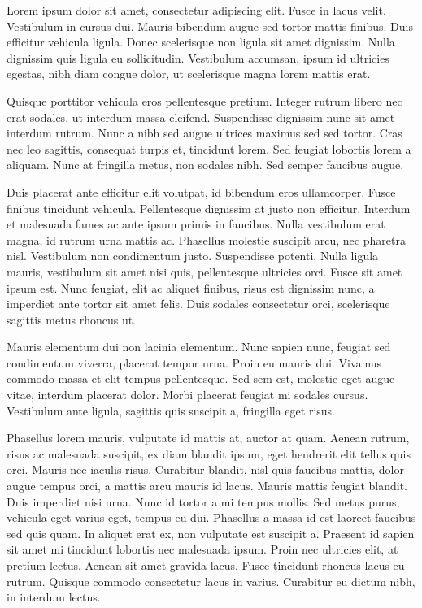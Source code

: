 Lorem ipsum dolor sit amet, consectetur adipiscing elit. Fusce in lacus velit.
Vestibulum in cursus dui. Mauris bibendum augue sed tortor mattis finibus. Duis
efficitur vehicula ligula. Donec scelerisque non ligula sit amet dignissim.
Nulla dignissim quis ligula eu sollicitudin. Vestibulum accumsan, ipsum id
ultricies egestas, nibh diam congue dolor, ut scelerisque magna lorem mattis
erat.

Quisque porttitor vehicula eros pellentesque pretium. Integer rutrum libero nec
erat sodales, ut interdum massa eleifend. Suspendisse dignissim nunc sit amet
interdum rutrum. Nunc a nibh sed augue ultrices maximus sed sed tortor. Cras nec
leo sagittis, consequat turpis et, tincidunt lorem. Sed feugiat lobortis lorem a
aliquam. Nunc at fringilla metus, non sodales nibh. Sed semper faucibus augue.

Duis placerat ante efficitur elit volutpat, id bibendum eros ullamcorper. Fusce
finibus tincidunt vehicula. Pellentesque dignissim at justo non efficitur.
Interdum et malesuada fames ac ante ipsum primis in faucibus. Nulla vestibulum
erat magna, id rutrum urna mattis ac. Phasellus molestie suscipit arcu, nec
pharetra nisl. Vestibulum non condimentum justo. Suspendisse potenti. Nulla
ligula mauris, vestibulum sit amet nisi quis, pellentesque ultricies orci. Fusce
sit amet ipsum est. Nunc feugiat, elit ac aliquet finibus, risus est dignissim
nunc, a imperdiet ante tortor sit amet felis. Duis sodales consectetur orci,
scelerisque sagittis metus rhoncus ut.

Mauris elementum dui non lacinia elementum. Nunc sapien nunc, feugiat sed
condimentum viverra, placerat tempor urna. Proin eu mauris dui. Vivamus commodo
massa et elit tempus pellentesque. Sed sem est, molestie eget augue vitae,
interdum placerat dolor. Morbi placerat feugiat mi sodales cursus. Vestibulum
ante ligula, sagittis quis suscipit a, fringilla eget risus.

Phasellus lorem mauris, vulputate id mattis at, auctor at quam. Aenean rutrum,
risus ac malesuada suscipit, ex diam blandit ipsum, eget hendrerit elit tellus
quis orci. Mauris nec iaculis risus. Curabitur blandit, nisl quis faucibus
mattis, dolor augue tempus orci, a mattis arcu mauris id lacus. Mauris mattis
feugiat blandit. Duis imperdiet nisi urna. Nunc id tortor a mi tempus mollis.
Sed metus purus, vehicula eget varius eget, tempus eu dui. Phasellus a massa id
est laoreet faucibus sed quis quam. In aliquet erat ex, non vulputate est
suscipit a. Praesent id sapien sit amet mi tincidunt lobortis nec malesuada
ipsum. Proin nec ultricies elit, at pretium lectus. Aenean sit amet gravida
lacus. Fusce tincidunt rhoncus lacus eu rutrum. Quisque commodo consectetur
lacus in varius. Curabitur eu dictum nibh, in interdum lectus.
